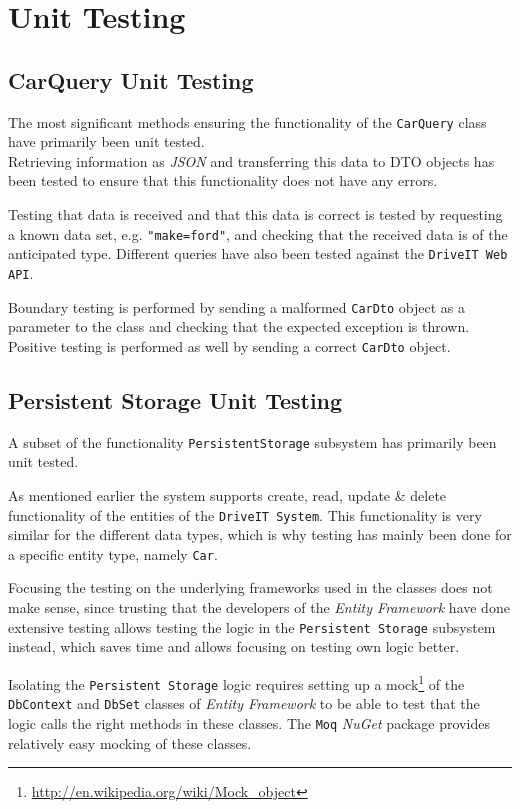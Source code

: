 \section{Unit Testing}
\subsection{CarQuery Unit Testing}
The most significant methods ensuring the functionality of the \texttt{CarQuery} class have primarily been unit tested.\\
Retrieving information as \textit{JSON} and transferring this data to DTO objects has been tested to ensure that this functionality does not have any errors.

Testing that data is received and that this data is correct is tested by requesting a known data set, e.g. \texttt{"make=ford"}, and checking that the received data is of the anticipated type. Different queries have also been tested against the \texttt{DriveIT Web API}.

Boundary testing is performed by sending a malformed \texttt{CarDto} object as a parameter to the class and checking that the expected exception is thrown. Positive testing is performed as well by sending a correct \texttt{CarDto} object.

\subsection{Persistent Storage Unit Testing}
A subset of the functionality \texttt{PersistentStorage} subsystem has primarily been unit tested.

As mentioned earlier the system supports create, read, update \& delete functionality of the entities of the \texttt{DriveIT System}. This functionality is very similar for the different data types, which is why testing has mainly been done for a specific entity type, namely \texttt{Car}.

Focusing the testing on the underlying frameworks used in the classes does not make sense, since trusting that the developers of the \textit{Entity Framework} have done extensive testing allows testing the logic in the \texttt{Persistent Storage} subsystem instead, which saves time and allows focusing on testing own logic better.

Isolating the \texttt{Persistent Storage} logic requires setting up a mock\footnote{\url{http://en.wikipedia.org/wiki/Mock_object}} of the \texttt{DbContext} and \texttt{DbSet} classes of \textit{Entity Framework} to be able to test that the logic calls the right methods in these classes. The \texttt{Moq} \textit{NuGet} package provides relatively easy mocking of these classes. 

